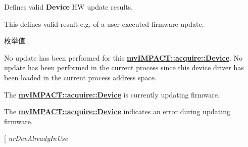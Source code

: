 Defines valid {\bfseries Device} H\+W update results. 

This defines valid result e.\+g. of a user executed firmware update. \begin{Desc}
\item[枚举值]\par
\begin{description}
\item[{\em 
\hypertarget{group___common_interface_gga11e4aee028c717dbe4bd4a9e7d97832eaf8b3fd24963b6a9a5a89dbe6d741b86b}{ur\+No\+Update\+Performed}\label{group___common_interface_gga11e4aee028c717dbe4bd4a9e7d97832eaf8b3fd24963b6a9a5a89dbe6d741b86b}
}]No update has been performed for this {\bfseries \hyperlink{classmv_i_m_p_a_c_t_1_1acquire_1_1_device}{mv\+I\+M\+P\+A\+C\+T\+::acquire\+::\+Device}}. No update has been performed in the current process since this device driver has been loaded in the current process address space. \item[{\em 
\hypertarget{group___common_interface_gga11e4aee028c717dbe4bd4a9e7d97832eafc60807fcc6f0e9346a01d0f449041aa}{ur\+Update\+F\+W}\label{group___common_interface_gga11e4aee028c717dbe4bd4a9e7d97832eafc60807fcc6f0e9346a01d0f449041aa}
}]The {\bfseries \hyperlink{classmv_i_m_p_a_c_t_1_1acquire_1_1_device}{mv\+I\+M\+P\+A\+C\+T\+::acquire\+::\+Device}} is currently updating firmware. \item[{\em 
\hypertarget{group___common_interface_gga11e4aee028c717dbe4bd4a9e7d97832ea4d079f102d0b26695674c0c6480cf5db}{ur\+Update\+F\+W\+Error}\label{group___common_interface_gga11e4aee028c717dbe4bd4a9e7d97832ea4d079f102d0b26695674c0c6480cf5db}
}]The {\bfseries \hyperlink{classmv_i_m_p_a_c_t_1_1acquire_1_1_device}{mv\+I\+M\+P\+A\+C\+T\+::acquire\+::\+Device}} indicates an error during updating firmware. \item[{\em 
\hypertarget{group___common_interface_gga11e4aee028c717dbe4bd4a9e7d97832ea661e6f4d3df550741ca9e91ed6c4ab11}{ur\+Dev\+Already\+In\+Use}\label{group___common_interface_gga11e4aee028c717dbe4bd4a9e7d97832ea661e6f4d3df550741ca9e91ed6c4ab11}
}
\end{description}
\end{Desc}
